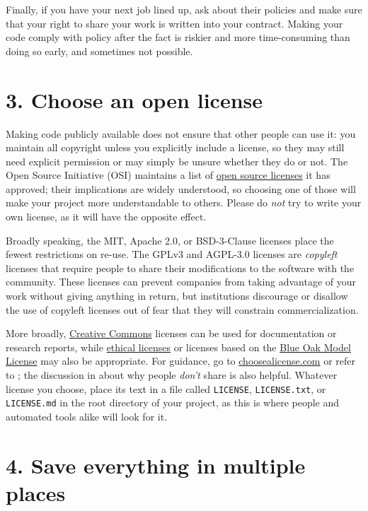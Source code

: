 \documentclass[10pt,letterpaper]{article}
\begin{document}
Finally,
if you have your next job lined up,
ask about their policies
and make sure that your right to share your work is written into your contract.
Making your code comply with policy after the fact is riskier and more time-consuming than doing so early,
and sometimes not possible.

\section*{3. Choose an open license}

Making code publicly available does not ensure that other people can use it:
you maintain all copyright unless you explicitly include a license,
so they may still need explicit permission
or may simply be unsure whether they do or not.
The Open Source Initiative (OSI)
maintains a list of \href{https://opensource.org/licenses}{open source licenses} it has approved;
their implications are widely understood,
so choosing one of those will make your project more understandable to others.
Please do \emph{not} try to write your own license,
as it will have the opposite effect.

Broadly speaking,
the MIT, Apache 2.0, or BSD-3-Clause licenses place the fewest restrictions on re-use.
The GPLv3 and AGPL-3.0 licenses are \emph{copyleft} licenses
that require people to share their modifications to the software with the community.
These licenses can prevent companies from taking advantage of your work without giving anything in return,
but institutions discourage or disallow the use of copyleft licenses
out of fear that they will constrain commercialization.

More broadly,
\href{https://creativecommons.org/}{Creative Commons} licenses can be used for documentation or research reports,
while \href{https://ethicalsource.dev/}{ethical licenses}
or licenses based on the \href{https://blueoakcouncil.org/license/1.0.0}{Blue Oak Model License} may also be appropriate.
For guidance,
go to \href{http://choosealicense.com}{choosealicense.com}
or refer to \cite{Fogel2020,Furtonato2021};
the discussion in \cite{Gomes2022} about why people \emph{don't} share is also helpful.
Whatever license you choose,
place its text in a file called \texttt{LICENSE}, \texttt{LICENSE.txt}, or \texttt{LICENSE.md}
in the root directory of your project,
as this is where people and automated tools alike will look for it.

\section*{4. Save everything in multiple places}
\end{document}
